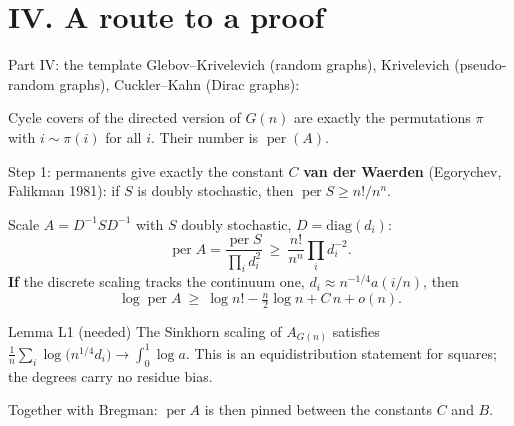 \documentclass[11pt,aspectratio=169]{beamer}
\begin{document}
\section{IV. A route to a proof}
\begin{frame}{Part IV: the template}
Glebov--Krivelevich (random graphs), Krivelevich (pseudo-random graphs), Cuckler--Kahn (Dirac graphs):

\medskip
\begin{center}
\end{center}
\medskip
Cycle covers of the directed version of $G(n)$ are exactly the permutations $\pi$ with
$i\sim\pi(i)$ for all $i$. Their number is $\operatorname{per}(A)$.
\end{frame}

\begin{frame}{Step 1: permanents give exactly the constant $C$}
\textbf{van der Waerden} (Egorychev, Falikman 1981): if $S$ is doubly stochastic, then
$\operatorname{per}S\ge n!/n^n$.

\medskip
Scale $A=D^{-1}SD^{-1}$ with $S$ doubly stochastic, $D=\mathrm{diag}(d_i)$:
\[
\operatorname{per}A=\frac{\operatorname{per}S}{\prod_i d_i^2}\ \ge\ \frac{n!}{n^n}\prod_i d_i^{-2}.
\]
\textbf{If} the discrete scaling tracks the continuum one,
$d_i\approx n^{-1/4}a(i/n)$, then
\[
\log\operatorname{per}A\ \ge\ \log n!-\tfrac n2\log n+C\,n+o(n).
\]
\begin{block}{Lemma L1 (needed)}
The Sinkhorn scaling of $A_{G(n)}$ satisfies $\frac1n\sum_i\log\bigl(n^{1/4}d_i\bigr)\to\int_0^1\log a$.
This is an equidistribution statement for squares; the degrees carry no residue bias.
\end{block}
Together with Bregman: $\operatorname{per}A$ is then pinned between the constants $C$ and $B$.
\end{frame}
\end{document}

